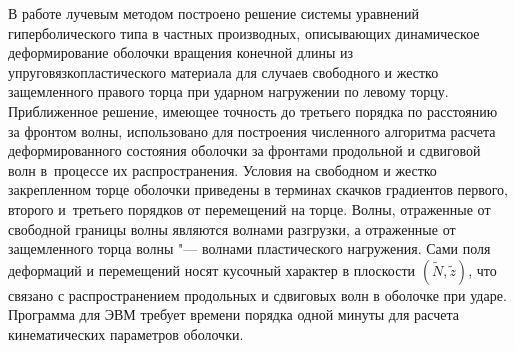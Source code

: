 \smallskip

В работе лучевым методом построено решение системы уравнений гиперболического типа в частных производных, описывающих динамическое деформирование оболочки вращения конечной длины из упруговязкопластического материала для случаев свободного и жестко защемленного правого торца при ударном нагружении по левому торцу. Приближенное решение, имеющее точность до третьего порядка по расстоянию за фронтом волны, использовано для построения численного алгоритма расчета деформированного состояния оболочки за фронтами продольной и сдвиговой волн в~процессе их распространения. Условия на свободном и жестко закрепленном торце оболочки приведены в терминах скачков градиентов первого, второго и~третьего порядков от перемещений на торце. 
Волны, отраженные от свободной границы волны являются волнами разгрузки, а отраженные от защемленного торца волны "--- волнами пластического нагружения. Сами поля деформаций и перемещений носят кусочный характер в плоскости $(\tilde N, \tilde z)$, что связано с распространением продольных и сдвиговых волн в оболочке при ударе.  Программа для ЭВМ требует времени порядка одной минуты для расчета кинематических параметров оболочки.



